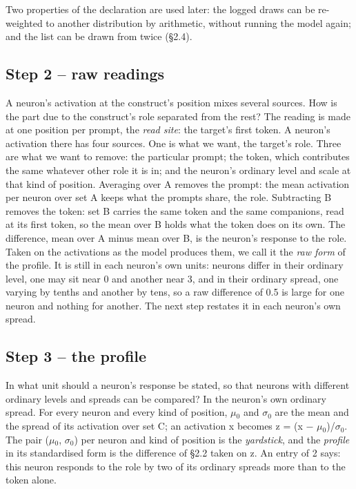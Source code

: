 \documentclass{article}
\begin{document}
Two properties of the declaration are used later: the logged draws can be re-weighted to another distribution by arithmetic, without running the model again; and the list can be drawn from twice (\S2.4).

\subsection{Step 2 -- raw readings}

A neuron's activation at the construct's position mixes several sources. How is the part due to the construct's role separated from the rest? The reading is made at one position per prompt, the \emph{read site}: the target's first token. A neuron's activation there has four sources. One is what we want, the target's role. Three are what we want to remove: the particular prompt; the token, which contributes the same whatever other role it is in; and the neuron's ordinary level and scale at that kind of position. Averaging over A removes the prompt: the mean activation per neuron over set A keeps what the prompts share, the role. Subtracting B removes the token: set B carries the same token and the same companions, read at its first token, so the mean over B holds what the token does on its own. The difference, mean over A minus mean over B, is the neuron's response to the role. Taken on the activations as the model produces them, we call it the \emph{raw form} of the profile. It is still in each neuron's own units: neurons differ in their ordinary level, one may sit near 0 and another near 3, and in their ordinary spread, one varying by tenths and another by tens, so a raw difference of 0.5 is large for one neuron and nothing for another. The next step restates it in each neuron's own spread.

\subsection{Step 3 -- the profile}

In what unit should a neuron's response be stated, so that neurons with different ordinary levels and spreads can be compared? In the neuron's own ordinary spread. For every neuron and every kind of position, $\mu$$_0$ and $\sigma$$_0$ are the mean and the spread of its activation over set C; an activation x becomes z = (x $-$ $\mu$$_0$)/$\sigma$$_0$. The pair ($\mu$$_0$, $\sigma$$_0$) per neuron and kind of position is the \emph{yardstick}, and the \emph{profile} in its standardised form is the difference of \S2.2 taken on z. An entry of 2 says: this neuron responds to the role by two of its ordinary spreads more than to the token alone.
\end{document}
